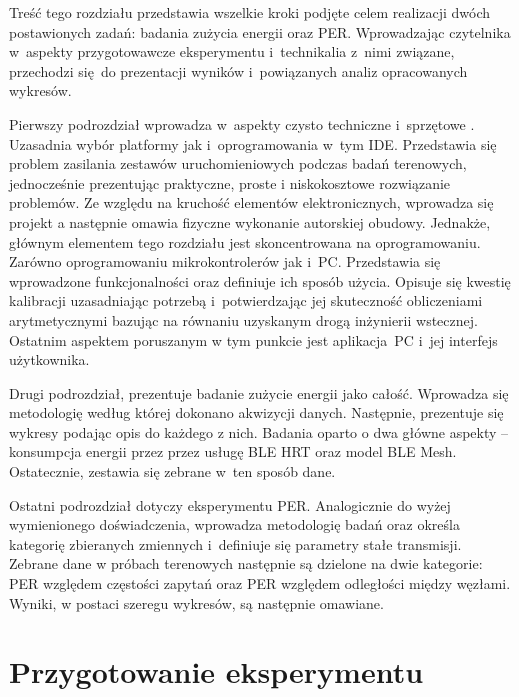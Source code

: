 Treść tego rozdziału przedstawia wszelkie kroki podjęte celem realizacji dwóch
postawionych zadań: badania zużycia energii oraz \gls{PER}. Wprowadzając
czytelnika w~aspekty przygotowawcze eksperymentu i~technikalia z~nimi związane,
przechodzi się do prezentacji wyników i~powiązanych analiz opracowanych wykresów.

Pierwszy podrozdział wprowadza w~aspekty czysto techniczne i~sprzętowe . Uzasadnia wybór
platformy jak i~oprogramowania w~tym \gls{IDE}. Przedstawia się problem
zasilania zestawów uruchomieniowych podczas badań terenowych, jednocześnie prezentując
praktyczne, proste i niskokosztowe rozwiązanie problemów. Ze względu na kruchość
elementów elektronicznych, wprowadza się projekt a następnie omawia
fizyczne wykonanie autorskiej obudowy. Jednakże, głównym elementem tego rozdziału 
jest skoncentrowana na oprogramowaniu. Zarówno oprogramowaniu mikrokontrolerów jak 
i~PC. Przedstawia się wprowadzone funkcjonalności oraz definiuje ich sposób użycia.
Opisuje się kwestię kalibracji uzasadniając potrzebą i~potwierdzając jej skuteczność 
obliczeniami arytmetycznymi bazując na równaniu uzyskanym drogą inżynierii wstecznej.
Ostatnim aspektem poruszanym w tym punkcie jest aplikacja~PC i~jej interfejs
użytkownika.

Drugi podrozdział, prezentuje badanie zużycie energii jako całość. Wprowadza się metodologię
według której dokonano akwizycji danych. Następnie, prezentuje się wykresy podając opis
do każdego z nich. Badania oparto o dwa główne aspekty -- konsumpcja energii przez
przez usługę BLE \gls{HRT} oraz model BLE Mesh. Ostatecznie, zestawia się zebrane
w~ten sposób dane.

Ostatni podrozdział dotyczy eksperymentu PER. Analogicznie do wyżej wymienionego
doświadczenia, wprowadza metodologię badań oraz określa kategorię zbieranych zmiennych
i~definiuje się parametry stałe transmisji. Zebrane dane w próbach terenowych następnie
są dzielone na dwie kategorie: PER względem częstości zapytań oraz PER względem
odległości między węzłami. Wyniki, w postaci szeregu wykresów, są następnie
omawiane.

\section{Przygotowanie eksperymentu}

